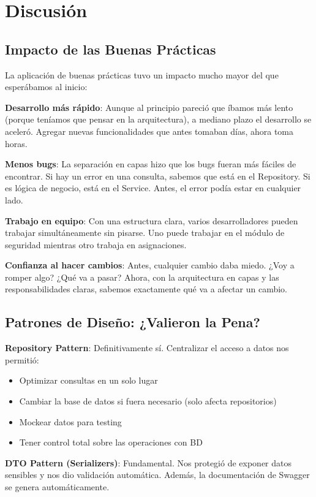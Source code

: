 \section{Discusión}

\subsection{Impacto de las Buenas Prácticas}

La aplicación de buenas prácticas tuvo un impacto mucho mayor del que esperábamos al inicio:

\textbf{Desarrollo más rápido}: Aunque al principio pareció que íbamos más lento (porque teníamos que pensar en la arquitectura), a mediano plazo el desarrollo se aceleró. Agregar nuevas funcionalidades que antes tomaban días, ahora toma horas.

\textbf{Menos bugs}: La separación en capas hizo que los bugs fueran más fáciles de encontrar. Si hay un error en una consulta, sabemos que está en el Repository. Si es lógica de negocio, está en el Service. Antes, el error podía estar en cualquier lado.

\textbf{Trabajo en equipo}: Con una estructura clara, varios desarrolladores pueden trabajar simultáneamente sin pisarse. Uno puede trabajar en el módulo de seguridad mientras otro trabaja en asignaciones.

\textbf{Confianza al hacer cambios}: Antes, cualquier cambio daba miedo. ¿Voy a romper algo? ¿Qué va a pasar? Ahora, con la arquitectura en capas y las responsabilidades claras, sabemos exactamente qué va a afectar un cambio.

\subsection{Patrones de Diseño: ¿Valieron la Pena?}

\textbf{Repository Pattern}: Definitivamente sí. Centralizar el acceso a datos nos permitió:
\begin{itemize}
    \item Optimizar consultas en un solo lugar
    \item Cambiar la base de datos si fuera necesario (solo afecta repositorios)
    \item Mockear datos para testing
    \item Tener control total sobre las operaciones con BD
\end{itemize}

\textbf{DTO Pattern (Serializers)}: Fundamental. Nos protegió de exponer datos sensibles y nos dio validación automática. Además, la documentación de Swagger se genera automáticamente.


